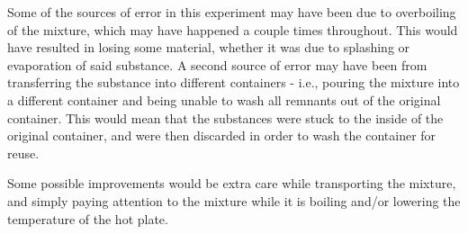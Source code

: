 \documentclass{article}
\begin{document}
  Some of the sources of error in this experiment may have been due to overboiling of the mixture,
  which may have happened a couple times throughout. This would have resulted in losing some material,
  whether it was due to splashing or evaporation of said substance. A second source of error may have
  been from transferring the substance into different containers - i.e., pouring the mixture into a
  different container and being unable to wash all remnants out of the original container. This would
  mean that the substances were stuck to the inside of the original container, and were then discarded
  in order to wash the container for reuse.

  Some possible improvements would be extra care while transporting the mixture, and simply paying attention
  to the mixture while it is boiling and/or lowering the temperature of the hot plate.
\end{document}
